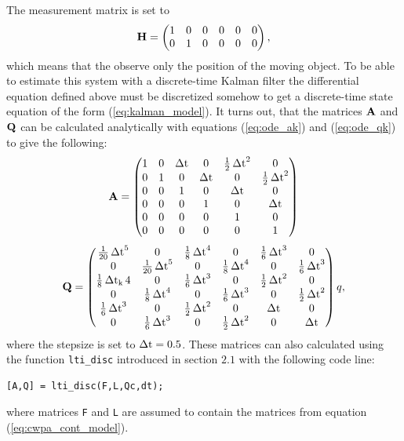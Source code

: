 The measurement matrix is set to
%
\begin{equation}
%
\mat{H} = \begin{pmatrix}
1 & 0 & 0 & 0 & 0 & 0 \\
0 & 1 & 0 & 0 & 0 & 0 \\
\end{pmatrix},
%
\end{equation}
%
which means that the observe only the position of the moving object.
To be able to estimate this system with a discrete-time Kalman filter the differential equation defined
above must be discretized somehow to get a discrete-time state equation of the form (\ref{eq:kalman_model}). It
turns out, that the matrices $\mathbf{A}$ and $\mathbf{Q}$ can be calculated analytically with equations (\ref{eq:ode_ak})
and (\ref{eq:ode_qk}) to give the following:
%
\begin{align}
%
\mat{A}  = \begin{pmatrix}
1 & 0 & \dt & 0    & \frac{1}{2}\dt^2    & 0 \\
0 & 1 & 0    & \dt & 0    & \frac{1}{2}\dt^2\\
0 & 0 & 1    & 0    & \dt & 0 \\
0 & 0 & 0    & 1    & 0    & \dt \\
0 & 0 & 0    & 0    & 1    & 0 \\
0 & 0 & 0    & 0    & 0    & 1 \\ 
\end{pmatrix}  
\end{align}%
\begin{align}
\mat{Q}  =   \begin{pmatrix}
\frac{1}{20}\dt^5 & 0 & \frac{1}{8}\dt^4 & 0 & \frac{1}{6}\dt^3 & 0 \\
0 & \frac{1}{20}\dt^5 & 0 & \frac{1}{8}\dt^4 & 0 & \frac{1}{6}\dt^3 \\
\frac{1}{8}\dtk4 & 0 & \frac{1}{6}\dt^3 & 0 &\frac{1}{2}\dt^2  & 0 \\
0 & \frac{1}{8}\dt^4 & 0 & \frac{1}{6}\dt^3 & 0 & \frac{1}{2}\dt^2 \\
\frac{1}{6}\dt^3 & 0 & \frac{1}{2}\dt^2 & 0 & \dt & 0 \\
0 & \frac{1}{6}\dt^3 & 0 & \frac{1}{2}\dt^2 & 0 & \dt 
\end{pmatrix}q,
%
\end{align}
%
where the stepsize is set to $\operatorname{\Delta t} = 0.5$. These matrices can also
calculated using the function \texttt{lti\_disc}
introduced in section $2.1$ with the following code line:
%
\begin{lstlisting}
[A,Q] = lti_disc(F,L,Qc,dt);
\end{lstlisting}
% 
where matrices \texttt{F} and \texttt{L} are assumed to contain the matrices from equation
(\ref{eq:cwpa_cont_model}). 

